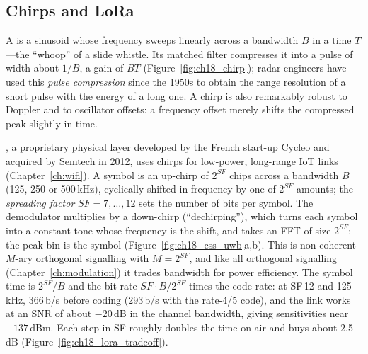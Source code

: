 \subsection{Chirps and LoRa}

A  is a sinusoid whose frequency sweeps linearly across a bandwidth $B$ in a time
$T$---the ``whoop'' of a slide whistle. Its matched filter compresses it into a pulse of width
about $1/B$, a gain of $BT$ (Figure~\ref{fig:ch18_chirp}); radar engineers have used this
\emph{pulse compression} since the 1950s to obtain the range resolution of a short pulse with the
energy of a long one. A chirp is also remarkably robust to Doppler and to oscillator offsets: a
frequency offset merely shifts the compressed peak slightly in time.

, a proprietary physical layer developed by the French start-up Cycleo and acquired by
Semtech in 2012, uses chirps for low-power, long-range IoT links (Chapter~\ref{ch:wifi}). A
symbol is an up-chirp of $2^{SF}$ chips across a bandwidth $B$ (125, 250 or 500\,kHz),
cyclically shifted in frequency by one of $2^{SF}$ amounts; the \emph{spreading factor}
$SF=7,\dots,12$ sets the number of bits per symbol. The demodulator multiplies by a
down-chirp (``dechirping''), which turns each symbol into a constant tone whose frequency is
the shift, and takes an FFT of size $2^{SF}$: the peak bin is the symbol
(Figure~\ref{fig:ch18_css_uwb}a,b). This is non-coherent $M$-ary orthogonal signalling with
$M=2^{SF}$, and like all orthogonal signalling (Chapter~\ref{ch:modulation}) it trades
bandwidth for power efficiency. The symbol time is $2^{SF}/B$ and the bit rate
$SF\cdot B/2^{SF}$ times the code rate: at SF\,12 and 125\,kHz, 366\,b/s before coding (293\,b/s
with the rate-4/5 code), and the link works at an SNR of about $-20$\,dB in the channel bandwidth,
giving sensitivities near $-137$\,dBm. Each step in SF roughly doubles the time on air and buys
about 2.5\,dB (Figure~\ref{fig:ch18_lora_tradeoff}).


